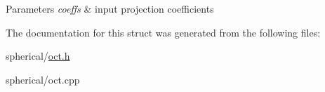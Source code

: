 \begin{DoxyParams}{\-Parameters}
{\em coeffs} & input projection coefficients \\
\hline
\end{DoxyParams}


\-The documentation for this struct was generated from the following files\-:\begin{DoxyCompactItemize}
\item 
spherical/\hyperlink{oct_8h}{oct.\-h}\item 
spherical/oct.\-cpp\end{DoxyCompactItemize}
